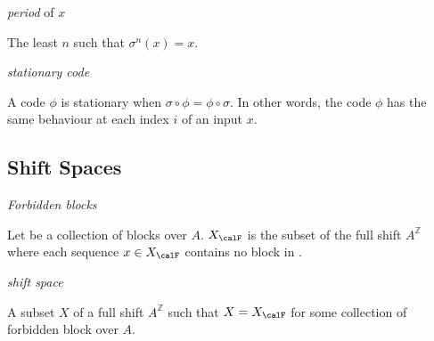 \begdef
\textit{period} of $x$

The least $n$ such that $\sigma^n(x) = x$.
\edefi

\begdef
\textit{stationary code}

A code $\phi$ is stationary when $\sigma \circ \phi = \phi \circ
\sigma$.  In other words, the code $\phi$ has the same behaviour at
each index $i$ of an input $x$.
\edefi

\subsection{Shift Spaces}

\begdef
\textit{Forbidden blocks}

Let \calF be a collection of blocks over $A$. $X_\calF$ is the subset of
the full shift $A^{\mathbb{Z}}$ where each sequence $x \in X_\calF$ contains
no block in \calF.
\edefi

\begdef
\textit{shift space}

A subset $X$ of a full shift $A^{\mathbb{Z}}$ such that $X = X_\calF$ for some
collection \calF of forbidden block over $A$.
\edefi
